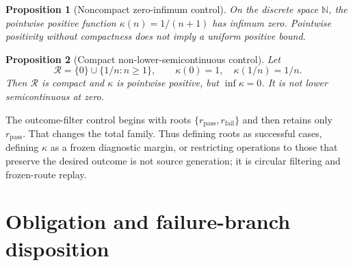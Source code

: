 \documentclass[11pt]{article}
\newtheorem{proposition}{Proposition}
\begin{document}
\begin{proposition}[Noncompact zero-infimum control]
On the discrete space \(\mathbb N\), the pointwise positive function
\(\kappa(n)=1/(n+1)\) has infimum zero.  Pointwise positivity without
compactness does not imply a uniform positive bound.
\end{proposition}

\begin{proposition}[Compact non-lower-semicontinuous control]
Let
\[
  \mathcal R=\{0\}\cup\{1/n:n\geq1\},\qquad
  \kappa(0)=1,\quad \kappa(1/n)=1/n.
\]
Then \(\mathcal R\) is compact and \(\kappa\) is pointwise positive, but
\(\inf\kappa=0\).  It is not lower semicontinuous at zero.
\end{proposition}

The outcome-filter control begins with roots
\(\{r_{\mathrm{pass}},r_{\mathrm{fail}}\}\) and then retains only
\(r_{\mathrm{pass}}\).  That changes the total family.  Thus defining roots
as successful cases, defining \(\kappa\) as a frozen diagnostic margin, or
restricting operations to those that preserve the desired outcome is not
source generation; it is circular filtering and frozen-route replay.

\section{Obligation and failure-branch disposition}
\end{document}
